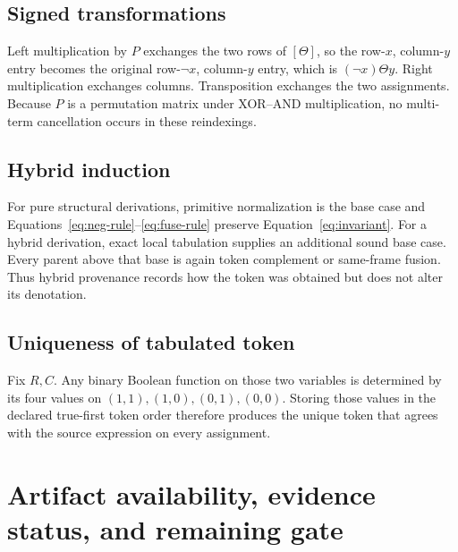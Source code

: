 \documentclass[10pt]{article}
\theoremstyle{plain}
\theoremstyle{definition}
\theoremstyle{remark}
\begin{document}
\subsection{Signed transformations}

Left multiplication by $P$ exchanges the two rows of $[\Theta]$, so the row-$x$, column-$y$ entry becomes the original row-$\neg x$, column-$y$ entry, which is $(\neg x)\Theta y$. Right multiplication exchanges columns. Transposition exchanges the two assignments. Because $P$ is a permutation matrix under XOR--AND multiplication, no multi-term cancellation occurs in these reindexings.

\subsection{Hybrid induction}

For pure structural derivations, primitive normalization is the base case and Equations~\eqref{eq:neg-rule}--\eqref{eq:fuse-rule} preserve Equation~\eqref{eq:invariant}. For a hybrid derivation, exact local tabulation supplies an additional sound base case. Every parent above that base is again token complement or same-frame fusion. Thus hybrid provenance records how the token was obtained but does not alter its denotation.

\subsection{Uniqueness of tabulated token}

Fix $R,C$. Any binary Boolean function on those two variables is determined by its four values on $(1,1),(1,0),(0,1),(0,0)$. Storing those values in the declared true-first token order therefore produces the unique token that agrees with the source expression on every assignment.

\section{Artifact availability, evidence status, and remaining gate}
\label{sec:availability}
\end{document}
